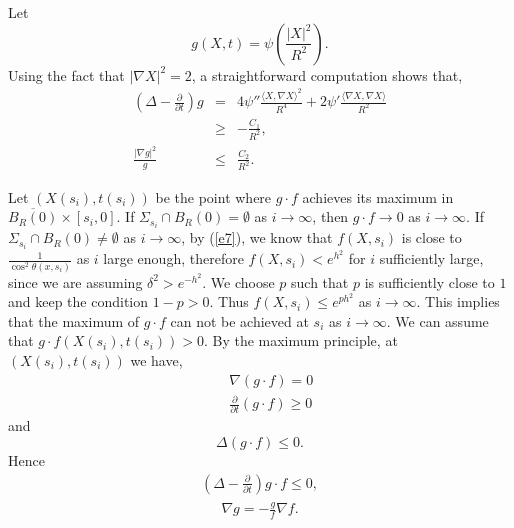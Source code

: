 Let $$g(X, t)=\psi(\frac{|X|^2}{R^2}).$$  Using the fact that
$|\nabla X|^2=2$,  a straightforward computation shows that,
\begin{eqnarray}\label{e5}
(\Delta-\frac{\partial}{\partial t})g&=&4\psi''\frac{\langle X,
\nabla X\rangle^2}{R^4}+2\psi'\frac{\langle\nabla X, \nabla
X\rangle}{R^2}\nonumber\\ &\geq&-\frac{C_1}{R^2}\nonumber, \\
\frac{|\nabla g|^2}{g}&\leq& \frac{C_2}{R^2}.
\end{eqnarray}

Let $(X(s_i), t(s_i))$ be the point where $g\cdot f$ achieves its
maximum in $\overline{B_{R}(0)}\times [s_i, 0]$. If
$\Sigma_{s_i}\cap B_R(0)=\emptyset$ as $i\to\infty$, then $g\cdot
f\to 0$ as $i\to\infty$. If $\Sigma_{s_i}\cap B_R(0)\neq\emptyset$
as $i\to\infty$, by (\ref{e7}), we know that $f(X, s_i)$ is close
to $\frac{1}{\cos^2\theta(x, s_i)}$ as $i$ large enough, therefore
$f(X, s_i)<e^{h^2}$ for $i$ sufficiently large, since we are
assuming $\delta^2>e^{-h^2}$. We choose $p$ such that $p$ is
sufficiently close to $1$ and keep the condition $1-p>0$. Thus
$f(X, s_i)\leq e^{ph^2}$ as $i\to\infty$. This implies that the
maximum of $g\cdot f$ can not be achieved at $s_i$ as
$i\to\infty$. We can assume that $g\cdot f(X(s_i), t(s_i))>0$. By
the maximum principle, at $(X(s_i), t(s_i))$ we have,
\begin{eqnarray}\label{e1}
&&\nabla(g\cdot f)=0 \nonumber\\ &&\frac{\partial}{\partial
t}(g\cdot f)\geq 0
\end{eqnarray}
and  $$\Delta(g\cdot f)\leq 0. $$ Hence
\begin{eqnarray}\label{e2}(\Delta-\frac{\partial}{\partial
t})g\cdot f\leq 0,\end{eqnarray}
\begin{eqnarray}\label{e11}
\nabla g=-\frac{g}{f}\nabla f.
\end{eqnarray}

